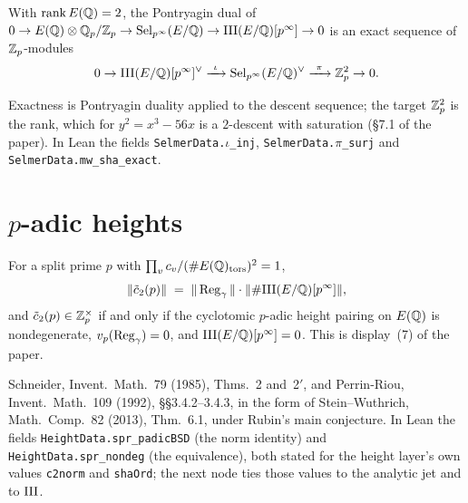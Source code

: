 \begin{assumption}
  \label{assum:DescentSequence}
  \leanok
  With $\operatorname{rank} E(\mathbb{Q}) = 2$, the Pontryagin dual of
  $0 \to E(\mathbb{Q}) \otimes \mathbb{Q}_p/\mathbb{Z}_p \to \mathrm{Sel}_{p^\infty}(E/\mathbb{Q}) \to
  \mathrm{III}(E/\mathbb{Q})[p^\infty] \to 0$ is an exact sequence of $\mathbb{Z}_p$-modules
  \[
    0 \to \mathrm{III}(E/\mathbb{Q})[p^\infty]^\vee \xrightarrow{\ \iota\ }
    \mathrm{Sel}_{p^\infty}(E/\mathbb{Q})^\vee \xrightarrow{\ \pi\ } \mathbb{Z}_p^2 \to 0 .
  \]

  Exactness is Pontryagin duality applied to the descent sequence; the
  target $\mathbb{Z}_p^2$ is the rank, which for $y^2 = x^3 - 56x$ is a $2$-descent
  with saturation (\S 7.1 of the paper). In Lean the fields
  \texttt{SelmerData.}$\iota$\texttt{\_inj}, \texttt{SelmerData.}$\pi$\texttt{\_surj} and
  \texttt{SelmerData.mw\_sha\_exact}.
\end{assumption}

\section{$p$-adic heights}

\begin{assumption}
  \label{assum:PadicBSDLeadingTerm}
  \leanok
  For a split prime $p$ with $\prod_v c_v/(\#E(\mathbb{Q})_{\mathrm{tors}})^2 = 1$,
  \[
    \|\tilde c_2(p)\| \;=\; \|\operatorname{Reg}_\gamma\| \cdot \|\#\mathrm{III}(E/\mathbb{Q})[p^\infty]\| ,
  \]
  and $\tilde c_2(p) \in \mathbb{Z}_p^\times$ if and only if the cyclotomic $p$-adic
  height pairing on $E(\mathbb{Q})$ is nondegenerate, $v_p(\operatorname{Reg}_\gamma) = 0$, and
  $\mathrm{III}(E/\mathbb{Q})[p^\infty] = 0$. This is display~(7) of the paper.

  Schneider, Invent.\ Math.\ 79 (1985), Thms.~2 and~2$'$, and Perrin-Riou,
  Invent.\ Math.\ 109 (1992), \S\S 3.4.2--3.4.3, in the form of
  Stein--Wuthrich, Math.\ Comp.\ 82 (2013), Thm.~6.1, under Rubin's main
  conjecture. In Lean the fields \texttt{HeightData.spr\_padicBSD} (the norm
  identity) and \texttt{HeightData.spr\_nondeg} (the equivalence), both
  stated for the height layer's own values \texttt{c2norm} and
  \texttt{shaOrd}; the next node ties those values to the analytic jet and to
  $\mathrm{III}$.
\end{assumption}


